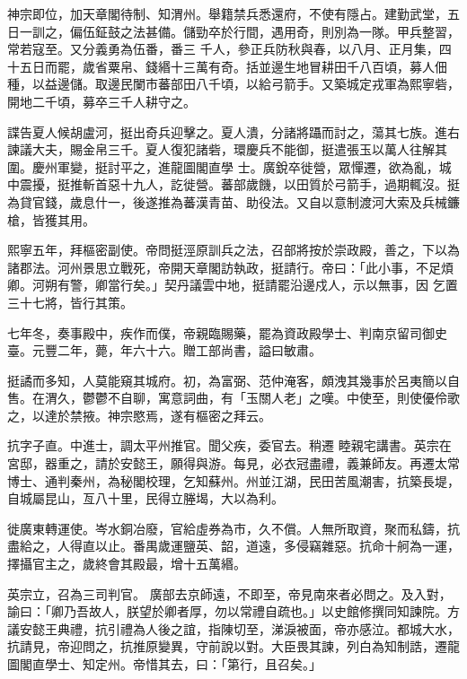 \begin{pinyinscope}
 神宗即位，加天章閣待制、知渭州。舉籍禁兵悉還府，不使有隱占。建勤武堂，五日一訓之，偏伍鉦鼓之法甚備。儲勁卒於行間，遇用奇，則別為一隊。甲兵整習，常若寇至。又分義勇為伍番，番三
 千人，參正兵防秋與春，以八月、正月集，四十五日而罷，歲省粟帛、錢緡十三萬有奇。括並邊生地冒耕田千八百頃，募人佃種，以益邊儲。取邊民闌市蕃部田八千頃，以給弓箭手。又築城定戎軍為熙寧砦，開地二千頃，募卒三千人耕守之。



 諜告夏人候胡盧河，挺出奇兵迎擊之。夏人潰，分諸將躡而討之，蕩其七族。進右諫議大夫，賜金帛三千。夏人復犯諸砦，環慶兵不能御，挺遣張玉以萬人往解其圍。慶州軍變，挺討平之，進龍圖閣直學
 士。廣銳卒徙營，眾憚遷，欲為亂，城中震擾，挺推斬首惡十九人，訖徙營。蕃部歲饑，以田質於弓箭手，過期輒沒。挺為貸官錢，歲息什一，後遂推為蕃漢青苗、助役法。又自以意制渡河大索及兵械鐮槍，皆獲其用。



 熙寧五年，拜樞密副使。帝問挺涇原訓兵之法，召部將按於崇政殿，善之，下以為諸郡法。河州景思立戰死，帝開天章閣訪執政，挺請行。帝曰：「此小事，不足煩卿。河朔有警，卿當行矣。」契丹議雲中地，挺請罷沿邊戍人，示以無事，因
 乞置三十七將，皆行其策。



 七年冬，奏事殿中，疾作而僕，帝親臨賜藥，罷為資政殿學士、判南京留司御史臺。元豐二年，薨，年六十六。贈工部尚書，謚曰敏肅。



 挺譎而多知，人莫能窺其城府。初，為富弼、范仲淹客，頗洩其幾事於呂夷簡以自售。在渭久，鬱鬱不自聊，寓意詞曲，有「玉關人老」之嘆。中使至，則使優伶歌之，以達於禁掖。神宗愍焉，遂有樞密之拜云。



 抗字子直。中進士，調太平州推官。聞父疾，委官去。稍遷
 睦親宅講書。英宗在宮邸，器重之，請於安懿王，願得與游。每見，必衣冠盡禮，義兼師友。再遷太常博士、通判秦州，為秘閣校理，乞知蘇州。州並江湖，民田苦風潮害，抗築長堤，自城屬昆山，亙八十里，民得立塍堨，大以為利。



 徙廣東轉運使。岑水銅冶廢，官給虛券為市，久不償。人無所取資，聚而私鑄，抗盡給之，人得直以止。番禺歲運鹽英、韶，道遠，多侵竊雜惡。抗命十舸為一運，擇攝官主之，歲終會其殿最，增十五萬緡。



 英宗立，召為三司判官。
 廣部去京師遠，不即至，帝見南來者必問之。及入對，諭曰：「卿乃吾故人，朕望於卿者厚，勿以常禮自疏也。」以史館修撰同知諫院。方議安懿王典禮，抗引禮為人後之誼，指陳切至，涕淚被面，帝亦感泣。都城大水，抗請見，帝迎問之，抗推原變異，守前說以對。大臣畏其諫，列白為知制誥，遷龍圖閣直學士、知定州。帝惜其去，曰：「第行，且召矣。」




\end{pinyinscope}
